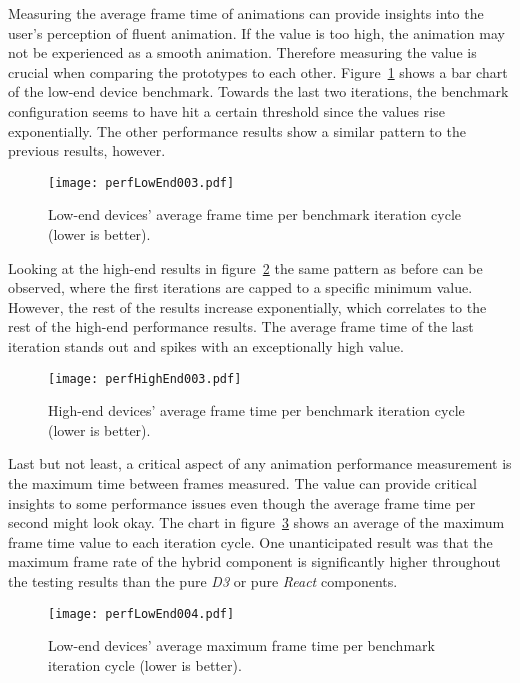 
Measuring the average frame time of animations can provide insights into the user's perception of fluent animation. If the value is too high, the animation may not be experienced as a smooth animation. Therefore measuring the value is crucial when comparing the prototypes to each other. Figure~\ref{fig:perfLowEnd003} shows a bar chart of the low-end device benchmark. Towards the last two iterations, the benchmark configuration seems to have hit a certain threshold since the values rise exponentially. The other performance results show a similar pattern to the previous results, however.

\begin{figure}
\centering
\texttt{[image: perfLowEnd003.pdf]}
\caption{Low-end devices' average frame time per benchmark iteration cycle (lower is better).}
\label{fig:perfLowEnd003}
\end{figure}

Looking at the high-end results in figure~\ref{fig:perfHighEnd003} the same pattern as before can be observed, where the first iterations are capped to a specific minimum value. However, the rest of the results increase exponentially, which correlates to the rest of the high-end performance results. The average frame time of the last iteration stands out and spikes with an exceptionally high value.

\begin{figure}
\centering
\texttt{[image: perfHighEnd003.pdf]}
\caption{High-end devices' average frame time per benchmark iteration cycle (lower is better).}
\label{fig:perfHighEnd003}
\end{figure}

Last but not least, a critical aspect of any animation performance measurement is the maximum time between frames measured. The value can provide critical insights to some performance issues even though the average frame time per second might look okay. The chart in figure~\ref{fig:perfLowEnd004} shows an average of the maximum frame time value to each iteration cycle. One unanticipated result was that the maximum frame rate of the hybrid component is significantly higher throughout the testing results than the pure \emph{D3} or pure \emph{React} components.

\begin{figure}
\centering
\texttt{[image: perfLowEnd004.pdf]}
\caption{Low-end devices' average maximum frame time per benchmark iteration cycle (lower is better).}
\label{fig:perfLowEnd004}
\end{figure}

